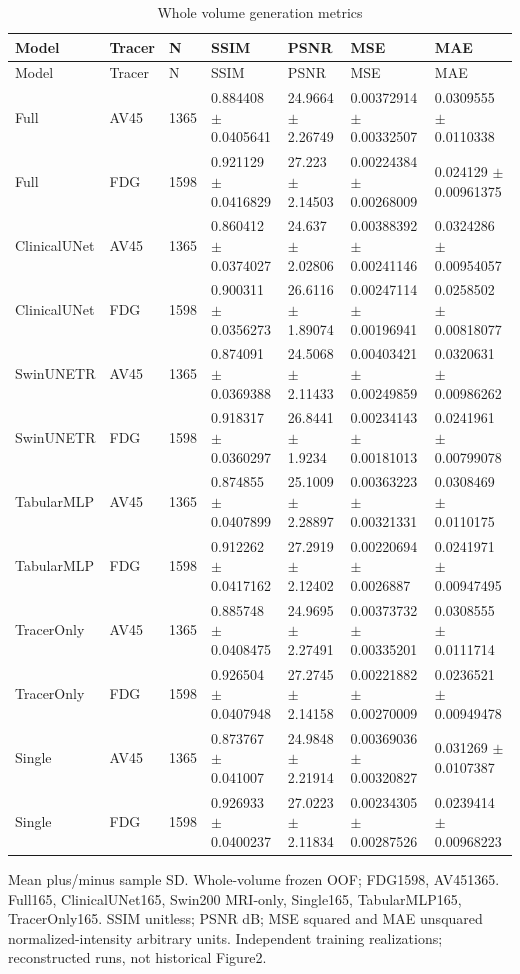 \begin{landscape}
\begingroup
\footnotesize
\setlength{\tabcolsep}{4pt}
\begin{longtable}{lllllll}
\caption{Whole volume generation metrics}\label{tab:s-n01}\\
\toprule
Model & Tracer & N & SSIM & PSNR & MSE & MAE \\
\midrule
\endfirsthead
\toprule
Model & Tracer & N & SSIM & PSNR & MSE & MAE \\
\midrule
\endhead
\bottomrule
\endfoot
Full & AV45 & 1365 & 0.884408 \(\pm\) 0.0405641 & 24.9664 \(\pm\) 2.26749 & 0.00372914 \(\pm\) 0.00332507 & 0.0309555 \(\pm\) 0.0110338 \\
Full & FDG & 1598 & 0.921129 \(\pm\) 0.0416829 & 27.223 \(\pm\) 2.14503 & 0.00224384 \(\pm\) 0.00268009 & 0.024129 \(\pm\) 0.00961375 \\
ClinicalUNet & AV45 & 1365 & 0.860412 \(\pm\) 0.0374027 & 24.637 \(\pm\) 2.02806 & 0.00388392 \(\pm\) 0.00241146 & 0.0324286 \(\pm\) 0.00954057 \\
ClinicalUNet & FDG & 1598 & 0.900311 \(\pm\) 0.0356273 & 26.6116 \(\pm\) 1.89074 & 0.00247114 \(\pm\) 0.00196941 & 0.0258502 \(\pm\) 0.00818077 \\
SwinUNETR & AV45 & 1365 & 0.874091 \(\pm\) 0.0369388 & 24.5068 \(\pm\) 2.11433 & 0.00403421 \(\pm\) 0.00249859 & 0.0320631 \(\pm\) 0.00986262 \\
SwinUNETR & FDG & 1598 & 0.918317 \(\pm\) 0.0360297 & 26.8441 \(\pm\) 1.9234 & 0.00234143 \(\pm\) 0.00181013 & 0.0241961 \(\pm\) 0.00799078 \\
TabularMLP & AV45 & 1365 & 0.874855 \(\pm\) 0.0407899 & 25.1009 \(\pm\) 2.28897 & 0.00363223 \(\pm\) 0.00321331 & 0.0308469 \(\pm\) 0.0110175 \\
TabularMLP & FDG & 1598 & 0.912262 \(\pm\) 0.0417162 & 27.2919 \(\pm\) 2.12402 & 0.00220694 \(\pm\) 0.0026887 & 0.0241971 \(\pm\) 0.00947495 \\
TracerOnly & AV45 & 1365 & 0.885748 \(\pm\) 0.0408475 & 24.9695 \(\pm\) 2.27491 & 0.00373732 \(\pm\) 0.00335201 & 0.0308555 \(\pm\) 0.0111714 \\
TracerOnly & FDG & 1598 & 0.926504 \(\pm\) 0.0407948 & 27.2745 \(\pm\) 2.14158 & 0.00221882 \(\pm\) 0.00270009 & 0.0236521 \(\pm\) 0.00949478 \\
Single & AV45 & 1365 & 0.873767 \(\pm\) 0.041007 & 24.9848 \(\pm\) 2.21914 & 0.00369036 \(\pm\) 0.00320827 & 0.031269 \(\pm\) 0.0107387 \\
Single & FDG & 1598 & 0.926933 \(\pm\) 0.0400237 & 27.0223 \(\pm\) 2.11834 & 0.00234305 \(\pm\) 0.00287526 & 0.0239414 \(\pm\) 0.00968223 \\
\end{longtable}
\noindent\parbox{\linewidth}{\footnotesize Mean plus/minus sample SD. Whole-volume frozen OOF; FDG1598, AV451365. Full165, ClinicalUNet165, Swin200 MRI-only, Single165, TabularMLP165, TracerOnly165. SSIM unitless; PSNR dB; MSE squared and MAE unsquared normalized-intensity arbitrary units. Independent training realizations; reconstructed runs, not historical Figure2.}
\endgroup
\end{landscape}
